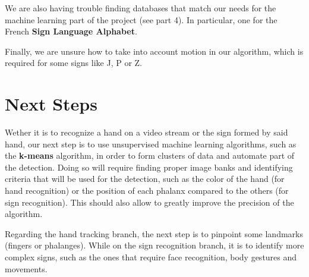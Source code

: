 \documentclass{article}
\begin{document}
	We are also having trouble finding databases that match our needs for the machine learning part of the project (see part 4). In particular, one for the French \textbf{Sign Language Alphabet}.

	Finally, we are unsure how to take into account motion in our algorithm, which is required for some signs like J, P or Z.
	
	\section{Next Steps}\label{sec:fourth}
	
	Wether it is to recognize a hand on a video stream or the sign formed by said hand, our next step is to use unsupervised machine learning algorithms, such as the \textbf{k-means} algorithm, in order to form clusters of data and automate part of the detection. Doing so will require finding proper image banks and identifying criteria that will be used for the detection, such as the color of the hand (for hand recognition) or the position of each phalanx compared to the others (for sign recognition). This should also allow to greatly improve the precision of the algorithm.
	
	Regarding the hand tracking branch, the next step is to pinpoint some landmarks (fingers or phalanges). While on the sign recognition branch, it is to identify more complex signs, such as the ones that require face recognition, body gestures and movements. 
	
	
	
\end{document}
